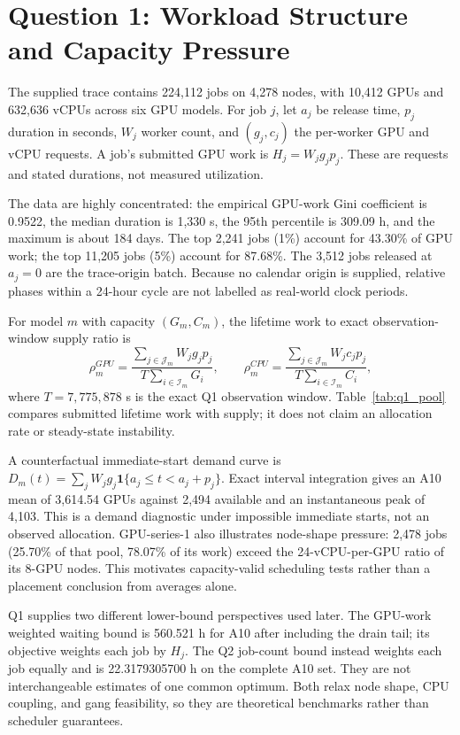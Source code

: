 \section{Question 1: Workload Structure and Capacity Pressure}
\label{sec:q1}
The supplied trace contains 224,112 jobs on 4,278 nodes, with 10,412 GPUs and 632,636 vCPUs across six GPU models. For job $j$, let $a_j$ be release time, $p_j$ duration in seconds, $W_j$ worker count, and $(g_j,c_j)$ the per-worker GPU and vCPU requests. A job's submitted GPU work is $H_j=W_jg_jp_j$. These are requests and stated durations, not measured utilization.

The data are highly concentrated: the empirical GPU-work Gini coefficient is 0.9522, the median duration is 1,330 s, the 95th percentile is 309.09 h, and the maximum is about 184 days. The top 2,241 jobs (1\%) account for 43.30\% of GPU work; the top 11,205 jobs (5\%) account for 87.68\%. The 3,512 jobs released at $a_j=0$ are the trace-origin batch. Because no calendar origin is supplied, relative phases within a 24-hour cycle are not labelled as real-world clock periods.

For model $m$ with capacity $(G_m,C_m)$, the lifetime work to exact observation-window supply ratio is
\begin{equation}
 \rho_m^{GPU}=\frac{\sum_{j\in\mathcal J_m}W_jg_jp_j}{T\sum_{i\in\mathcal I_m}G_i},\qquad
 \rho_m^{CPU}=\frac{\sum_{j\in\mathcal J_m}W_jc_jp_j}{T\sum_{i\in\mathcal I_m}C_i},
\end{equation}
where $T=7,775,878$ s is the exact Q1 observation window. Table~\ref{tab:q1_pool} compares submitted lifetime work with supply; it does not claim an allocation rate or steady-state instability.

\begin{table}[H]\centering\caption{Submitted lifetime work and exact-window capacity ratios.}\label{tab:q1_pool}\end{table}

A counterfactual immediate-start demand curve is $D_m(t)=\sum_jW_jg_j\mathbf 1\{a_j\le t<a_j+p_j\}$. Exact interval integration gives an A10 mean of 3,614.54 GPUs against 2,494 available and an instantaneous peak of 4,103. This is a demand diagnostic under impossible immediate starts, not an observed allocation. GPU-series-1 also illustrates node-shape pressure: 2,478 jobs (25.70\% of that pool, 78.07\% of its work) exceed the 24-vCPU-per-GPU ratio of its 8-GPU nodes. This motivates capacity-valid scheduling tests rather than a placement conclusion from averages alone.

Q1 supplies two different lower-bound perspectives used later. The GPU-work weighted waiting bound is 560.521 h for A10 after including the drain tail; its objective weights each job by $H_j$. The Q2 job-count bound instead weights each job equally and is 22.3179305700 h on the complete A10 set. They are not interchangeable estimates of one common optimum. Both relax node shape, CPU coupling, and gang feasibility, so they are theoretical benchmarks rather than scheduler guarantees.
